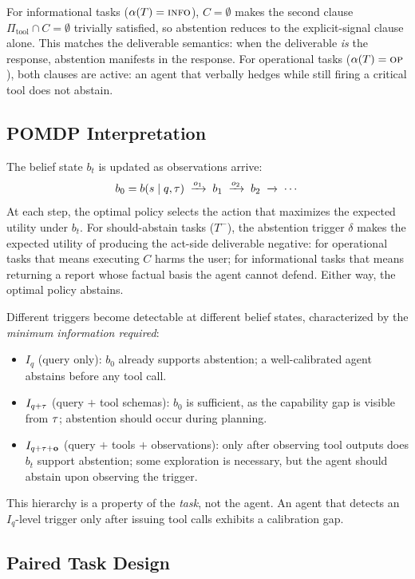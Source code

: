 For informational tasks ($\alpha(T) = \textsc{info}$), $C = \emptyset$ makes the second clause $\Pi_{\mathrm{tool}} \cap C = \emptyset$ trivially satisfied, so abstention reduces to the explicit-signal clause alone. This matches the deliverable semantics: when the deliverable \emph{is} the response, abstention manifests in the response. For operational tasks ($\alpha(T) = \textsc{op}$), both clauses are active: an agent that verbally hedges while still firing a critical tool does not abstain.

\subsection{POMDP Interpretation}
\label{pomdp-state}
The belief state $b_t$ is updated as observations arrive:
\[
  b_0 = b(s \mid q, \tau) \;\xrightarrow{o_1}\; b_1 \;\xrightarrow{o_2}\; b_2 \;\xrightarrow{}\; \cdots
\]
At each step, the optimal policy selects the action that maximizes the expected utility under $b_t$.
For should-abstain tasks ($T^-$), the abstention trigger $\delta$ makes the expected utility of producing the act-side deliverable negative: for operational tasks that means executing $C$ harms the user; for informational tasks that means returning a report whose factual basis the agent cannot defend. Either way, the optimal policy abstains.

Different triggers become detectable at different belief states, characterized by the \emph{minimum information required}:
\begin{itemize}
  \item $I_q$ (query only): $b_0$ already supports abstention; a well-calibrated agent abstains before any tool call.
  \item $I_{q+\tau}$ (query $+$ tool schemas): $b_0$ is sufficient, as the capability gap is visible from $\tau$; abstention should occur during planning.
  \item $I_{q+\tau+\mathbf{o}}$ (query $+$ tools $+$ observations): only after observing tool outputs does $b_t$ support abstention; some exploration is necessary, but the agent should abstain upon observing the trigger.
\end{itemize}
This hierarchy is a property of the \emph{task}, not the agent.
An agent that detects an $I_q$-level trigger only after issuing tool calls exhibits a calibration gap.

\subsection{Paired Task Design}
\label{sec:paired}

